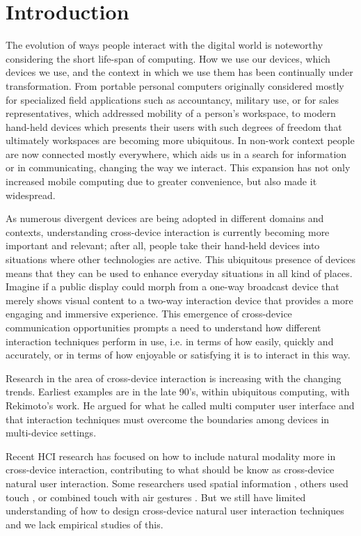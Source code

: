 \section{Introduction} \label{sec:introduction}
The evolution of ways people interact with the digital world is noteworthy considering the short life-span of computing. How we use our devices, which devices we use, and the context in which we use them has been continually under transformation. 
From portable personal computers originally considered mostly for specialized field applications such as accountancy, military use, or for sales representatives, which addressed mobility of a person's workspace, to modern hand-held devices which presents their users with such degrees of freedom that ultimately workspaces are becoming more ubiquitous. 
In non-work context people are now connected mostly everywhere, which aids us in a search for information or in communicating, changing the way we interact. 
This expansion has not only increased mobile computing due to greater convenience, but also made it widespread.\cite{Francis:1997} 

As numerous divergent devices are being adopted in different domains and contexts, understanding cross-device interaction is currently becoming more important and relevant; after all, people take their hand-held devices into situations where other technologies are active. This ubiquitous presence of devices means that they can be used to enhance everyday situations in all kind of places. Imagine if a public display could morph from a one-way broadcast device that merely shows visual content to a two-way interaction device that provides a more engaging and immersive experience. This emergence of cross-device communication opportunities prompts a need to understand how different interaction techniques perform in use, i.e. in terms of how easily, quickly and accurately, or in terms of how enjoyable or satisfying it is to interact in this way.

Research in the area of cross-device interaction is increasing with the changing trends. Earliest examples are in the late 90's, within ubiquitous computing, with Rekimoto's work.  He argued for what he called multi computer user interface and that interaction techniques must overcome the boundaries among devices in multi-device settings\cite{Rekimoto:1998}.

Recent HCI research has focused on how to include natural modality more in cross-device interaction, contributing to what should be know as cross-device natural user interaction.  Some researchers used spatial information \cite{Marquardt:2011, Marquardt:2012}, others used touch \cite{Seifert:2012}, or combined touch with air gestures \cite{Bragdon:2011}. But we still have limited understanding of how to design cross-device natural user interaction techniques and we lack empirical studies of this.

